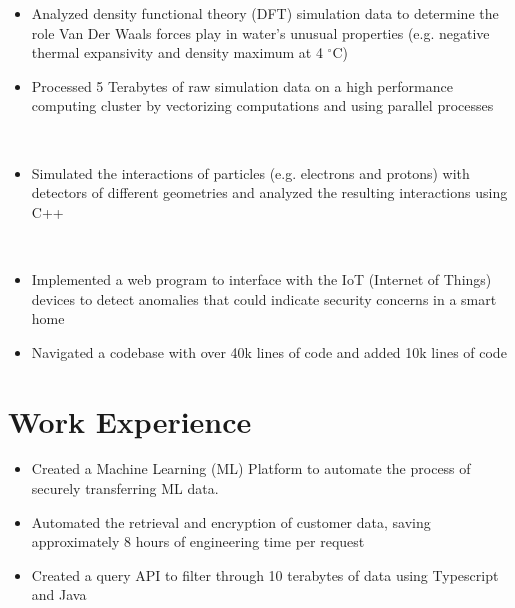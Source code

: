 \documentclass[letterpaper,11pt]{article}
\begin{document}
\begin{itemize}
    \item Analyzed density functional theory (DFT) simulation data to determine the role Van Der Waals forces play in water's unusual properties (e.g. negative thermal expansivity and density maximum at 4 $^\circ$C)
    \item Processed 5 Terabytes of raw simulation data on a high performance computing cluster by vectorizing computations and using parallel processes
\end{itemize}
\\
\begin{itemize}
    \item Simulated the interactions of particles (e.g. electrons and protons) with detectors of different geometries and analyzed the resulting interactions using C++

\end{itemize}
\\
\begin{itemize}
    \item Implemented a web program to interface with the IoT (Internet of Things) devices to detect anomalies that could indicate security concerns in a smart home
    \item Navigated a codebase with over 40k lines of code and added 10k lines of code
\end{itemize}

\section{Work Experience}
\begin{itemize}
    \item Created a Machine Learning (ML) Platform to automate the process of securely transferring ML data.
    \item Automated the retrieval and encryption of customer data, saving approximately 8 hours of engineering time per request
    \item Created a query API to filter through 10 terabytes of data using Typescript and Java
\end{itemize}
\end{document}
